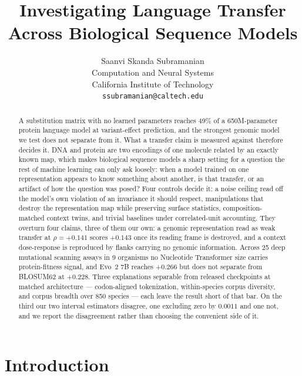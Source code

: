 \documentclass[11pt]{article}
\title{Investigating Language Transfer Across Biological Sequence Models}
\author{Saanvi Skanda Subramanian \\
  Computation and Neural Systems \\
  California Institute of Technology \\
  \texttt{ssubramanian@caltech.edu}}
\begin{document}
\maketitle

\begin{abstract}
A substitution matrix with no learned parameters reaches 49\% of a
650M-parameter protein language model at variant-effect prediction, and the
strongest genomic model we test does not separate from it. What a transfer claim
is measured against therefore decides it. DNA and protein are two encodings of one
molecule related by an exactly known map, which makes biological sequence models a
sharp setting for a question the rest of machine learning can only ask loosely: when a model trained on one
representation appears to know something about another, is that transfer, or an
artifact of how the question was posed? Four controls decide it: a noise ceiling read off the
model's own violation of an invariance it should respect, manipulations that
destroy the representation map while preserving surface statistics,
composition-matched context twins, and trivial baselines under correlated-unit
accounting. They overturn four claims, three of them our own: a genomic representation read as
weak transfer at $\rho=+0.141$ scores $+0.143$ once its reading frame is
destroyed, and a context dose-response is reproduced by flanks carrying no
genomic information. Across 25 deep mutational scanning assays in 9 organisms no
Nucleotide Transformer size carries protein-fitness signal, and Evo~2 7B reaches
$+0.266$ but does not separate from BLOSUM62 at $+0.228$. Three explanations
separable from released checkpoints at matched architecture --- codon-aligned
tokenization, within-species corpus diversity, and corpus breadth over 850
species --- each leave the result short of that bar. On the third our two
interval estimators disagree, one excluding zero by $0.0011$ and one not, and we
report the disagreement rather than choosing the convenient side of it.
\end{abstract}

\section{Introduction}
\end{document}
